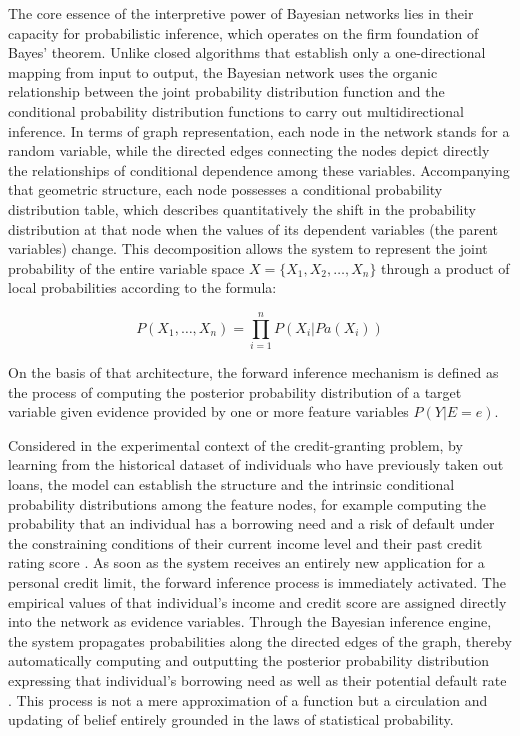 \noindent
The core essence of the interpretive power of Bayesian networks lies in their capacity for probabilistic inference, which operates on the firm foundation of Bayes' theorem. Unlike closed algorithms that establish only a one-directional mapping from input to output, the Bayesian network uses the organic relationship between the joint probability distribution function and the conditional probability distribution functions to carry out multidirectional inference. In terms of graph representation, each node in the network stands for a random variable, while the directed edges connecting the nodes depict directly the relationships of conditional dependence among these variables. Accompanying that geometric structure, each node possesses a conditional probability distribution table, which describes quantitatively the shift in the probability distribution at that node when the values of its dependent variables (the parent variables) change. This decomposition allows the system to represent the joint probability of the entire variable space $X = \{X_1, X_2, \dots, X_n\}$ through a product of local probabilities according to the formula:

\begin{equation}
    P(X_1, \dots, X_n) = \prod_{i=1}^n P(X_i | Pa(X_i))
\end{equation}

On the basis of that architecture, the forward inference mechanism is defined as the process of computing the posterior probability distribution of a target variable given evidence provided by one or more feature variables $P(Y|E=e)$. 

Considered in the experimental context of the credit-granting problem, by learning from the historical dataset of individuals who have previously taken out loans, the model can establish the structure and the intrinsic conditional probability distributions among the feature nodes, for example computing the probability that an individual has a borrowing need and a risk of default under the constraining conditions of their current income level and their past credit rating score \cite{liu2024credit}. As soon as the system receives an entirely new application for a personal credit limit, the forward inference process is immediately activated. The empirical values of that individual's income and credit score are assigned directly into the network as evidence variables. Through the Bayesian inference engine, the system propagates probabilities along the directed edges of the graph, thereby automatically computing and outputting the posterior probability distribution expressing that individual's borrowing need as well as their potential default rate \cite{murphy2012machine}. This process is not a mere approximation of a function but a circulation and updating of belief entirely grounded in the laws of statistical probability.

